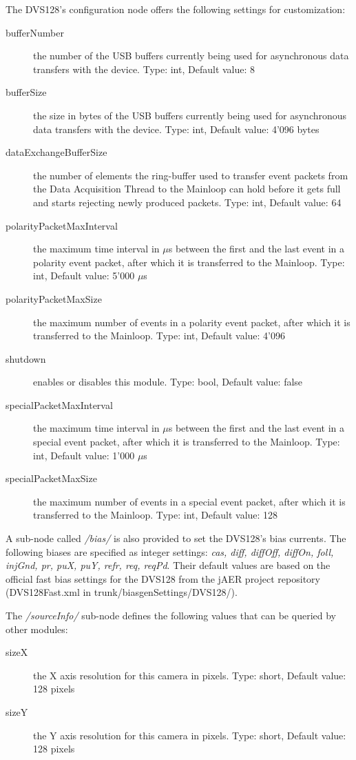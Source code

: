 \documentclass[a4paper,12pt]{report}
\begin{document}
The DVS128's configuration node offers the following settings for customization:
\begin{description}
\item[bufferNumber] the number of the USB buffers currently being used for asynchronous data transfers with the device.
\subitem Type: int, Default value: 8
\item[bufferSize] the size in bytes of the USB buffers currently being used for asynchronous data transfers with the device.
\subitem Type: int, Default value: 4'096 bytes
\item[dataExchangeBufferSize] the number of elements the ring-buffer used to transfer event packets from the Data Acquisition Thread to the Mainloop can hold before it gets full and starts rejecting newly produced packets.
\subitem Type: int, Default value: 64
\item[polarityPacketMaxInterval] the maximum time interval in $\mu$s between the first and the last event in a polarity event packet, after which it is transferred to the Mainloop.
\subitem Type: int, Default value: 5'000 $\mu$s
\item[polarityPacketMaxSize]  the maximum number of events in a polarity event packet, after which it is transferred to the Mainloop.
\subitem Type: int, Default value: 4'096
\item[shutdown] enables or disables this module.
\subitem Type: bool, Default value: false
\item[specialPacketMaxInterval] the maximum time interval in $\mu$s between the first and the last event in a special event packet, after which it is transferred to the Mainloop.
\subitem Type: int, Default value: 1'000 $\mu$s
\item[specialPacketMaxSize] the maximum number of events in a special event packet, after which it is transferred to the Mainloop.
\subitem Type: int, Default value: 128
\end{description}

A sub-node called \emph{/bias/} is also provided to set the DVS128's bias currents.
The following biases are specified as integer settings: \emph{cas, diff, diffOff, diffOn, foll, injGnd, pr, puX, puY, refr, req, reqPd}. Their default values are based on the official fast bias settings for the DVS128 from the jAER project \cite{jaer_project} repository (DVS128Fast.xml in trunk/biasgenSettings/DVS128/).

The \emph{/sourceInfo/} sub-node defines the following values that can be queried by other modules:
\begin{description}
\item[sizeX] the X axis resolution for this camera in pixels.
\subitem Type: short, Default value: 128 pixels
\item[sizeY] the Y axis resolution for this camera in pixels.
\subitem Type: short, Default value: 128 pixels
\end{description}
\end{document}
